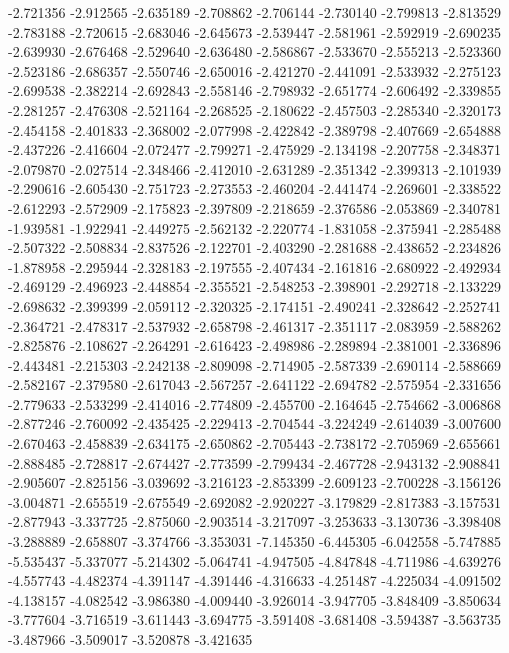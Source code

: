 -2.721356
-2.912565
-2.635189
-2.708862
-2.706144
-2.730140
-2.799813
-2.813529
-2.783188
-2.720615
-2.683046
-2.645673
-2.539447
-2.581961
-2.592919
-2.690235
-2.639930
-2.676468
-2.529640
-2.636480
-2.586867
-2.533670
-2.555213
-2.523360
-2.523186
-2.686357
-2.550746
-2.650016
-2.421270
-2.441091
-2.533932
-2.275123
-2.699538
-2.382214
-2.692843
-2.558146
-2.798932
-2.651774
-2.606492
-2.339855
-2.281257
-2.476308
-2.521164
-2.268525
-2.180622
-2.457503
-2.285340
-2.320173
-2.454158
-2.401833
-2.368002
-2.077998
-2.422842
-2.389798
-2.407669
-2.654888
-2.437226
-2.416604
-2.072477
-2.799271
-2.475929
-2.134198
-2.207758
-2.348371
-2.079870
-2.027514
-2.348466
-2.412010
-2.631289
-2.351342
-2.399313
-2.101939
-2.290616
-2.605430
-2.751723
-2.273553
-2.460204
-2.441474
-2.269601
-2.338522
-2.612293
-2.572909
-2.175823
-2.397809
-2.218659
-2.376586
-2.053869
-2.340781
-1.939581
-1.922941
-2.449275
-2.562132
-2.220774
-1.831058
-2.375941
-2.285488
-2.507322
-2.508834
-2.837526
-2.122701
-2.403290
-2.281688
-2.438652
-2.234826
-1.878958
-2.295944
-2.328183
-2.197555
-2.407434
-2.161816
-2.680922
-2.492934
-2.469129
-2.496923
-2.448854
-2.355521
-2.548253
-2.398901
-2.292718
-2.133229
-2.698632
-2.399399
-2.059112
-2.320325
-2.174151
-2.490241
-2.328642
-2.252741
-2.364721
-2.478317
-2.537932
-2.658798
-2.461317
-2.351117
-2.083959
-2.588262
-2.825876
-2.108627
-2.264291
-2.616423
-2.498986
-2.289894
-2.381001
-2.336896
-2.443481
-2.215303
-2.242138
-2.809098
-2.714905
-2.587339
-2.690114
-2.588669
-2.582167
-2.379580
-2.617043
-2.567257
-2.641122
-2.694782
-2.575954
-2.331656
-2.779633
-2.533299
-2.414016
-2.774809
-2.455700
-2.164645
-2.754662
-3.006868
-2.877246
-2.760092
-2.435425
-2.229413
-2.704544
-3.224249
-2.614039
-3.007600
-2.670463
-2.458839
-2.634175
-2.650862
-2.705443
-2.738172
-2.705969
-2.655661
-2.888485
-2.728817
-2.674427
-2.773599
-2.799434
-2.467728
-2.943132
-2.908841
-2.905607
-2.825156
-3.039692
-3.216123
-2.853399
-2.609123
-2.700228
-3.156126
-3.004871
-2.655519
-2.675549
-2.692082
-2.920227
-3.179829
-2.817383
-3.157531
-2.877943
-3.337725
-2.875060
-2.903514
-3.217097
-3.253633
-3.130736
-3.398408
-3.288889
-2.658807
-3.374766
-3.353031
-7.145350
-6.445305
-6.042558
-5.747885
-5.535437
-5.337077
-5.214302
-5.064741
-4.947505
-4.847848
-4.711986
-4.639276
-4.557743
-4.482374
-4.391147
-4.391446
-4.316633
-4.251487
-4.225034
-4.091502
-4.138157
-4.082542
-3.986380
-4.009440
-3.926014
-3.947705
-3.848409
-3.850634
-3.777604
-3.716519
-3.611443
-3.694775
-3.591408
-3.681408
-3.594387
-3.563735
-3.487966
-3.509017
-3.520878
-3.421635
